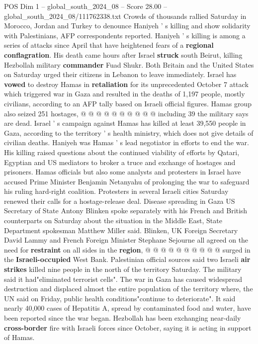 \begin{textsample}{POS Dim 1 – global\_south\_2024\_08 – Score 28.00 – global\_south\_2024\_08/111762338.txt}
Crowds of thousands rallied Saturday in Morocco, Jordan and Turkey to denounce Haniyeh ' s killing and show solidarity with Palestinians, AFP correspondents reported.
Haniyeh ' s killing is among a series of attacks since April that have heightened fears of a \textbf{regional} \textbf{conflagration}.
His death came hours after Israel \textbf{struck} south Beirut, killing Hezbollah military \textbf{commander} Fuad Shukr.
Both Britain and the United States on Saturday urged their citizens in Lebanon to leave immediately.
Israel has \textbf{vowed} to destroy Hamas in \textbf{retaliation} for its unprecedented October 7 attack which triggered war in Gaza and resulted in the deaths of 1,197 people, mostly civilians, according to an AFP tally based on Israeli official figures.
Hamas group also seized 251 hostages, @ @ @ @ @ @ @ @ @ @ including 39 the military says are dead.
Israel ' s campaign against Hamas has killed at least 39,550 people in Gaza, according to the territory ' s health ministry, which does not give details of civilian deaths.
Haniyeh was Hamas ' s lead negotiator in efforts to end the war.
His killing raised questions about the continued viability of efforts by Qatari, Egyptian and US mediators to broker a truce and exchange of hostages and prisoners.
Hamas officials but also some analysts and protesters in Israel have accused Prime Minister Benjamin Netanyahu of prolonging the war to safeguard his ruling hard-right coalition.
Protesters in several Israeli cities Saturday renewed their calls for a hostage-release deal.
Disease spreading in Gaza US Secretary of State Antony Blinken spoke separately with his French and British counterparts on Saturday about the situation in the Middle East, State Department spokesman Matthew Miller said.
Blinken, UK Foreign Secretary David Lammy and French Foreign Minister Stephane Sejourne all agreed on the need for \textbf{restraint} on all sides in the \textbf{region}, @ @ @ @ @ @ @ @ @ @ surged in the \textbf{Israeli-occupied} West Bank.
Palestinian official sources said two Israeli \textbf{air} \textbf{strikes} killed nine people in the north of the territory Saturday.
The military said it had"eliminated terrorist cells".
The war in Gaza has caused widespread destruction and displaced almost the entire population of the territory where, the UN said on Friday, public health conditions"continue to deteriorate".
It said nearly 40,000 cases of Hepatitis A, spread by contaminated food and water, have been reported since the war began.
Hezbollah has been exchanging near-daily \textbf{cross-border} fire with Israeli forces since October, saying it is acting in support of Hamas.

\end{textsample}
